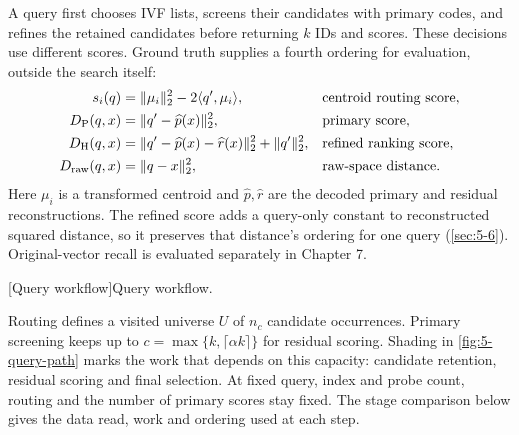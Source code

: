 A query first chooses IVF lists, screens their candidates with primary
codes, and refines the retained candidates before returning $k$ IDs and
scores. These decisions use different scores. Ground truth supplies a
fourth ordering for evaluation, outside the search itself:
\begin{align}
 s_i(q)&=\|\mu_i\|_2^2-2\langle q',\mu_i\rangle,
                   &&\text{centroid routing score},\nonumber\\
 D_{\mathrm{P}}(q,x)&=\|q'-\widehat p(x)\|_2^2,
                   &&\text{primary score},\nonumber\\
 D_{\mathrm{H}}(q,x)&=\|q'-\widehat p(x)-\widehat r(x)\|_2^2
                       +\|q'\|_2^2,
                   &&\text{refined ranking score},\nonumber\\
 D_{\mathrm{raw}}(q,x)&=\|q-x\|_2^2,
                   &&\text{raw-space distance}.
 \label{eq:5-ranking-objects}
\end{align}
Here $\mu_i$ is a transformed centroid and $\widehat p,\widehat r$ are
the decoded primary and residual reconstructions. The refined score adds
a query-only constant to reconstructed squared distance, so it preserves
that distance's ordering for one query (\cref{sec:5-6}). Original-vector
recall is evaluated separately in Chapter 7.

\par\medskip\noindent\begin{minipage}{\linewidth}
\captionsetup{hypcap=false}
\centering

[Query workflow]{Query workflow.}
\label{fig:5-query-path}
\end{minipage}\par\medskip
Routing defines a visited universe $U$ of $n_c$ candidate occurrences.
Primary screening keeps up to $c=\max\{k,\lceil\alpha k\rceil\}$ for
residual scoring. Shading in \cref{fig:5-query-path} marks the work that
depends on this capacity: candidate retention, residual scoring and
final selection. At fixed query, index and probe count, routing and the
number of primary scores stay fixed. The stage comparison below gives
the data read, work and ordering used at each step.

